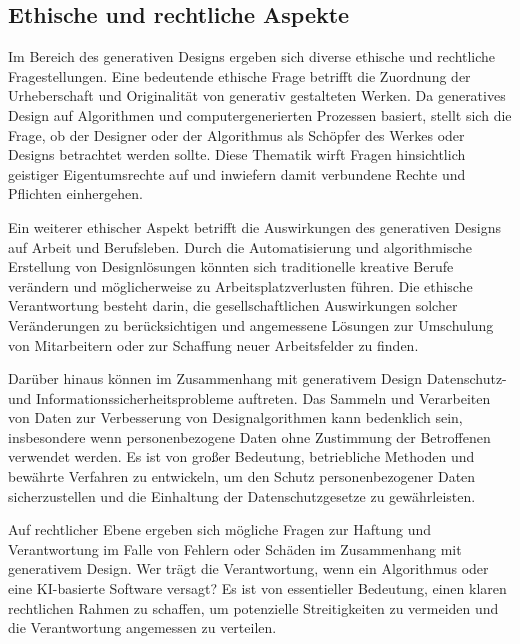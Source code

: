 \subsection*{Ethische und rechtliche Aspekte}
Im Bereich des generativen Designs ergeben sich diverse ethische und rechtliche Fragestellungen. Eine bedeutende ethische Frage betrifft die Zuordnung der Urheberschaft und Originalität von generativ gestalteten Werken. Da generatives Design auf Algorithmen und computergenerierten Prozessen basiert, stellt sich die Frage, ob der Designer oder der Algorithmus als Schöpfer des Werkes oder Designs betrachtet werden sollte. Diese Thematik wirft Fragen hinsichtlich geistiger Eigentumsrechte auf und inwiefern damit verbundene Rechte und Pflichten einhergehen.

Ein weiterer ethischer Aspekt betrifft die Auswirkungen des generativen Designs auf Arbeit und Berufsleben. Durch die Automatisierung und algorithmische Erstellung von Designlösungen könnten sich traditionelle kreative Berufe verändern und möglicherweise zu Arbeitsplatzverlusten führen. Die ethische Verantwortung besteht darin, die gesellschaftlichen Auswirkungen solcher Veränderungen zu berücksichtigen und angemessene Lösungen zur Umschulung von Mitarbeitern oder zur Schaffung neuer Arbeitsfelder zu finden.

Darüber hinaus können im Zusammenhang mit generativem Design Datenschutz- und Informationssicherheitsprobleme auftreten. Das Sammeln und Verarbeiten von Daten zur Verbesserung von Designalgorithmen kann bedenklich sein, insbesondere wenn personenbezogene Daten ohne Zustimmung der Betroffenen verwendet werden. Es ist von großer Bedeutung, betriebliche Methoden und bewährte Verfahren zu entwickeln, um den Schutz personenbezogener Daten sicherzustellen und die Einhaltung der Datenschutzgesetze zu gewährleisten.

Auf rechtlicher Ebene ergeben sich mögliche Fragen zur Haftung und Verantwortung im Falle von Fehlern oder Schäden im Zusammenhang mit generativem Design. Wer trägt die Verantwortung, wenn ein Algorithmus oder eine KI-basierte Software versagt? Es ist von essentieller Bedeutung, einen klaren rechtlichen Rahmen zu schaffen, um potenzielle Streitigkeiten zu vermeiden und die Verantwortung angemessen zu verteilen.

